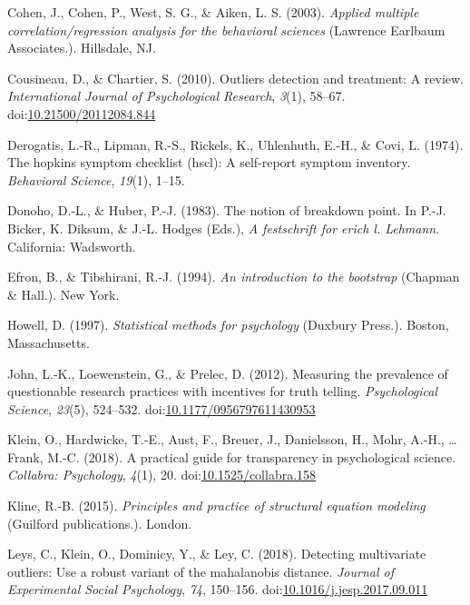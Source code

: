 \documentclass[man,floatsintext]{apa6}
\begin{document}
\leavevmode\hypertarget{ref-Cohen_et_al_2003}{}%
Cohen, J., Cohen, P., West, S. G., \& Aiken, L. S. (2003). \emph{Applied multiple correlation/regression analysis for the behavioral sciences} (Lawrence Earlbaum Associates.). Hillsdale, NJ.

\leavevmode\hypertarget{ref-Cousineau_Chartier_2010}{}%
Cousineau, D., \& Chartier, S. (2010). Outliers detection and treatment: A review. \emph{International Journal of Psychological Research}, \emph{3}(1), 58--67. doi:\href{https://doi.org/10.21500/20112084.844}{10.21500/20112084.844}

\leavevmode\hypertarget{ref-Derogatis_et_al_1974}{}%
Derogatis, L.-R., Lipman, R.-S., Rickels, K., Uhlenhuth, E.-H., \& Covi, L. (1974). The hopkins symptom checklist (hscl): A self‐report symptom inventory. \emph{Behavioral Science}, \emph{19}(1), 1--15.

\leavevmode\hypertarget{ref-Donoho_and_Huber_1983}{}%
Donoho, D.-L., \& Huber, P.-J. (1983). The notion of breakdown point. In P.-J. Bicker, K. Diksum, \& J.-L. Hodges (Eds.), \emph{A festschrift for erich l. Lehmann}. California: Wadsworth.

\leavevmode\hypertarget{ref-Efron_Tibshirani_1994}{}%
Efron, B., \& Tibshirani, R.-J. (1994). \emph{An introduction to the bootstrap} (Chapman \& Hall.). New York.

\leavevmode\hypertarget{ref-Howell_1997}{}%
Howell, D. (1997). \emph{Statistical methods for psychology} (Duxbury Press.). Boston, Massachusetts.

\leavevmode\hypertarget{ref-John_et_al_2012}{}%
John, L.-K., Loewenstein, G., \& Prelec, D. (2012). Measuring the prevalence of questionable research practices with incentives for truth telling. \emph{Psychological Science}, \emph{23}(5), 524--532. doi:\href{https://doi.org/10.1177/0956797611430953}{10.1177/0956797611430953}

\leavevmode\hypertarget{ref-Klein_et_al_2018}{}%
Klein, O., Hardwicke, T.-E., Aust, F., Breuer, J., Danielsson, H., Mohr, A.-H., \ldots{} Frank, M.-C. (2018). A practical guide for transparency in psychological science. \emph{Collabra: Psychology}, \emph{4}(1), 20. doi:\href{https://doi.org/10.1525/collabra.158}{10.1525/collabra.158}

\leavevmode\hypertarget{ref-Kline_2015}{}%
Kline, R.-B. (2015). \emph{Principles and practice of structural equation modeling} (Guilford publications.). London.

\leavevmode\hypertarget{ref-Leys_et_al_2018}{}%
Leys, C., Klein, O., Dominicy, Y., \& Ley, C. (2018). Detecting multivariate outliers: Use a robust variant of the mahalanobis distance. \emph{Journal of Experimental Social Psychology}, \emph{74}, 150--156. doi:\href{https://doi.org/10.1016/j.jesp.2017.09.011}{10.1016/j.jesp.2017.09.011}
\end{document}
